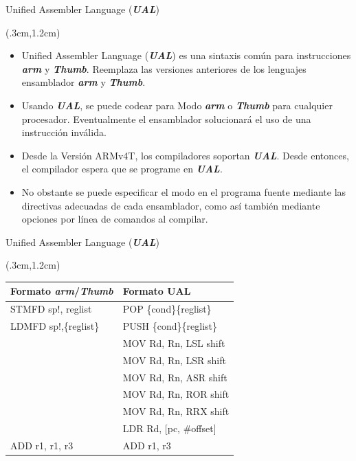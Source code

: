 \documentclass[usenames,table,dvipsnames,aspectratio=169]{beamer}
\newcommand{\arm}{\textbf{\textit{arm}}}
\newcommand{\Thumb}{\textbf{\textit{Thumb}}}
\begin{document}
\begin{frame}{Unified Assembler Language (\textbf{\textit{UAL}})}
 \begin{textblock*}{\textwidth}(.3cm,1.2cm) 
  \begin{itemize}[<+(1)->] \justifying
   \item Unified Assembler Language (\textbf{\textit{UAL}}) es una sintaxis común para instrucciones \arm{} y \Thumb{}. Reemplaza las versiones anteriores de los lenguajes ensamblador \arm{} y \Thumb{}.
   \item Usando \textbf{\textit{UAL}}, se puede codear para Modo \arm{} o \Thumb{} para cualquier procesador. Eventualmente el ensamblador solucionará el uso de una instrucción inválida.
   \item Desde la Versión ARMv4T, los compiladores soportan \textbf{\textit{UAL}}. Desde entonces, el compilador espera que se programe en \textbf{\textit{UAL}}. 
   \item No obstante se puede especificar el modo en el programa fuente mediante las directivas adecuadas de cada ensamblador, como así también mediante opciones por línea de comandos al compilar.
  \end{itemize}
\end{textblock*}
\end{frame}

\begin{frame}{Unified Assembler Language (\textbf{\textit{UAL}})}
  \begin{textblock*}{\textwidth}(.3cm,1.2cm) 
    \begin{center}
    \begin{tabular}{ll}
     \textbf{Formato \arm/\Thumb}     & \textbf{Formato UAL}\\
     \hline\hline
     STMFD sp!, {reglist}  & POP \{cond\}\{reglist\}\\
     LDMFD sp!,\{reglist\} & PUSH \{cond\}\{reglist\}\\
     \hline
      & MOV Rd, Rn, LSL shift\\
      & MOV Rd, Rn, LSR shift\\
      & MOV Rd, Rn, ASR shift\\
      & MOV Rd, Rn, ROR shift\\
      & MOV Rd, Rn, RRX shift\\
      \hline
      & LDR Rd, [pc, \#offset]\\
      \hline
      ADD r1, r1, r3 & ADD r1, r3\\
    \end{tabular}
  \end{center}
 \end{textblock*}
\end{frame}
\end{document}
